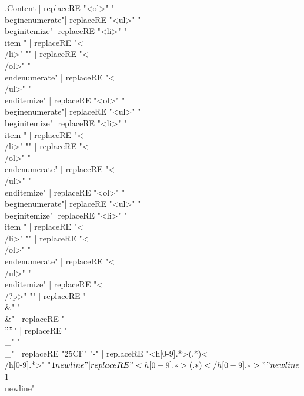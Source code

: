 \documentclass{report}
\begin{document}
              {{.Content | replaceRE "<ol>" "\\begin{enumerate}"| replaceRE "<ul>" "\\begin{itemize}"| replaceRE "<li>" "\\item " | replaceRE "<\\/li>" "" | replaceRE "<\\/ol>" "\\end{enumerate}" | replaceRE "<\\/ul>" "\\end{itemize}" | replaceRE "<ol>" "\\begin{enumerate}"| replaceRE "<ul>" "\\begin{itemize}"| replaceRE "<li>" "\\item " | replaceRE "<\\/li>" "" | replaceRE "<\\/ol>" "\\end{enumerate}" | replaceRE "<\\/ul>" "\\end{itemize}" | replaceRE "<ol>" "\\begin{enumerate}"| replaceRE "<ul>" "\\begin{itemize}"| replaceRE "<li>" "\\item " | replaceRE "<\\/li>" "" | replaceRE "<\\/ol>" "\\end{enumerate}" | replaceRE "<\\/ul>" "\\end{itemize}" | replaceRE "<\\/?p>" "" | replaceRE "\\&" "\\&" | replaceRE "\\$" "\\$" | replaceRE "\\_" "\\_" | replaceRE "\u25CF" "-" | replaceRE "<h[0-9].*>(.*)<\\/h[0-9].*>" "$1\\newline" | replaceRE "<h[0-9].*>(.*)<\\/h[0-9].*>" "\\newline$1\\newline"}}
\end{document}
